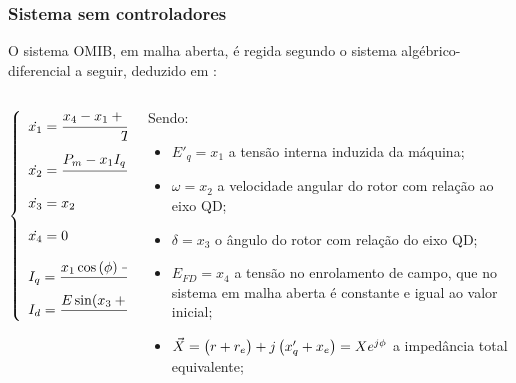 \documentclass[10pt, compress,xcolor={svgnames,dvipsnames,x11names}]{beamer}
\begin{document}
\begin{frame}%
\frametitle{Sistema sem controladores}
\scriptsize

	O sistema OMIB, em malha aberta, é regida segundo o sistema algébrico-diferencial a seguir, deduzido em \cite{livroDoLfComORodrigoEOBretas}:

\begin{columns}[T]
\begin{column}{0.5\textwidth}
\begin{align} \label{sis::sistemaDiferencialMalhaAberta}
\left\{ \begin{array}{l}
\dot{x_1} = \dfrac{x_4 - x_1 + \left(\strut x_d - x'_d \right)I_d}{T'_{do}} \\[4mm]
%
\dot{x_2} = \dfrac{P_m - x_1 I_q + \left(\strut x'_d - x'_q \right)\ I_d I_q}{2H}\\[4mm]
%
\dot{x_3} = x_2\\[4mm]
%
\dot{x_4} = 0\\[4mm]
%
I_q = \dfrac{x_1\cos\left(\phi\right) - E\cos(x_3 + \phi) }{X} \\[2mm]
%
I_d = \dfrac{E\sin(x_3 + \phi) - x_1\sin(\phi) }{X}
\end{array}\right.
\end{align}
\end{column}

\begin{column}{0.5\textwidth}
\vspace{1cm}
Sendo:

\begin{itemize}
	\item $E'_q = x_1$  a tensão interna induzida da máquina; 
	\item $\omega = x_2$ a velocidade angular do rotor com relação ao eixo QD;	
	\item $\delta = x_3$ o ângulo do rotor com relação do eixo QD;
	\item $E_{FD} = x_4$ a tensão no enrolamento de campo, que no sistema em malha aberta é constante e igual ao valor inicial;
		\item $\vec{X} = \left(\strut r + r_e \right) + j\left(x'_q + x_e\right) = Xe^{j\phi}$ a impedância total equivalente;
\end{itemize}
\end{column}
\end{columns}

\normalsize
\end{frame}%
\end{document}
